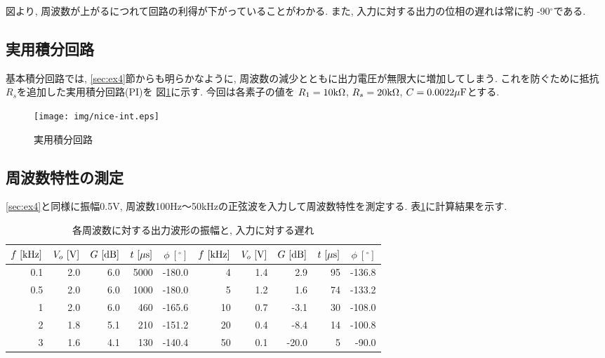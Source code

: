 \documentclass[titlepage]{jsarticle}
\begin{document}
            図より, 周波数が上がるにつれて回路の利得が下がっていることがわかる.
            また, 入力に対する出力の位相の遅れは常に約 -90$^\circ$である.

    \subsection{実用積分回路}
        基本積分回路では, \ref{sec:ex4}節からも明らかなように,
        周波数の減少とともに出力電圧が無限大に増加してしまう.
        これを防ぐために抵抗$R_s$を追加した実用積分回路(PI)を
        図\ref{fig:nice-int}に示す.
        今回は各素子の値を
        $R_1 = 10\rm{k\Omega}$,
        $R_s = 20\rm{k\Omega}$, $C = 0.0022\rm{\mu F}$とする.

        \begin{figure}[h]
            \centering
            \texttt{[image: img/nice-int.eps]}
            \caption{実用積分回路}
            \label{fig:nice-int}
        \end{figure}

        \subsection{周波数特性の測定} \label{sec:ex5}
            \ref{sec:ex4}と同様に振幅0.5V,
            周波数100Hz〜50kHzの正弦波を入力して周波数特性を測定する.
            表\ref{tab:nice-int}に計算結果を示す.

            \begin{table}[h]
                \caption{各周波数に対する出力波形の振幅と, 入力に対する遅れ}
                \label{tab:nice-int}
                \centering
                \begin{tabular}{r|rr|rr||r|rr|rr}
                    $f \ [\rm{kHz}]$ & $V_o \ [\rm{V]}$ & $G \ [\rm{dB}]$ & $t \ [\mu\rm{s}]$ & $\phi \ [^\circ]$ & $f \ [\rm{kHz}]$ & $V_o \ [\rm{V]}$ & $G \ [\rm{dB}]$ & $t \ [\mu\rm{s}]$ & $\phi \ [^\circ]$ \\ \hline \hline
                    0.1 & 2.0 & 6.0 & 5000 & -180.0 & 4 & 1.4 & 2.9 & 95 & -136.8 \\
                    0.5 & 2.0 & 6.0 & 1000 & -180.0 & 5 & 1.2 & 1.6 & 74 & -133.2 \\
                    1 & 2.0 & 6.0 & 460 & -165.6 & 10 & 0.7 & -3.1 & 30 & -108.0 \\
                    2 & 1.8 & 5.1 & 210 & -151.2 & 20 & 0.4 & -8.4 & 14 & -100.8 \\
                    3 & 1.6 & 4.1 & 130 & -140.4 & 50 & 0.1 & -20.0 & 5 & -90.0 \\
                \end{tabular}
            \end{table}
\end{document}
